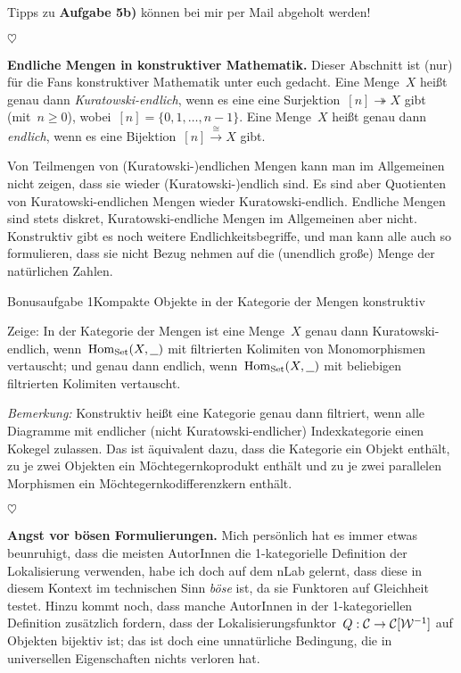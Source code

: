 \documentclass{uebblatt}
\newcommand{\stopper}{\begin{center}$\heartsuit$\end{center}}
\begin{document}
Tipps zu \textbf{Aufgabe 5b)} können bei mir per Mail abgeholt werden!

\stopper

\textbf{Endliche Mengen in konstruktiver Mathematik.} Dieser Abschnitt ist
(nur) für die Fans konstruktiver Mathematik unter euch gedacht.
Eine Menge~$X$ heißt genau dann \emph{Kuratowski-endlich}, wenn es eine
eine Surjektion~$[n] \twoheadrightarrow X$ gibt (mit~$n \geq 0$), wobei~$[n] =
\{0,1,\ldots,n-1\}$. Eine Menge~$X$ heißt genau dann \emph{endlich}, wenn es
eine Bijektion~$[n] \stackrel{\cong}{\to} X$ gibt.

Von Teilmengen von (Kuratowski-)endlichen Mengen kann man im Allgemeinen nicht
zeigen, dass sie wieder (Kuratowski-)endlich sind. Es sind aber Quotienten von
Kuratowski-endlichen Mengen wieder Kuratowski-endlich. Endliche Mengen sind
stets diskret, Kura\-towski-endliche Mengen im Allgemeinen aber nicht.
Konstruktiv gibt es noch weitere Endlichkeitsbegriffe, und man kann alle auch
so formulieren, dass sie nicht Bezug nehmen auf die (unendlich große) Menge der
natürlichen Zahlen.

\newpage

\begin{aufgabe*}{Bonusaufgabe 1}{Kompakte Objekte in der Kategorie der Mengen konstruktiv}

Zeige: In der Kategorie der Mengen ist eine Menge~$X$ genau dann
Kuratowski-endlich, wenn~$\mathrm{Hom}_{\mathrm{Set}}(X,\underline{\ \ })$ mit filtrierten
Kolimiten von Monomorphismen vertauscht; und genau dann endlich,
wenn~$\mathrm{Hom}_{\mathrm{Set}}(X,\underline{\ \ })$ mit beliebigen filtrierten Kolimiten
vertauscht.

\emph{Bemerkung:} Konstruktiv heißt eine Kategorie genau dann filtriert, wenn
alle Diagramme mit endlicher (nicht Kuratowski-endlicher) Indexkategorie einen
Kokegel zulassen. Das ist äquivalent dazu, dass die Kategorie ein Objekt
enthält, zu je zwei Objekten ein Möchtegernkoprodukt enthält und zu je zwei
parallelen Morphismen ein Möch\-te\-gern\-ko\-dif\-fe\-renz\-kern enthält.
\end{aufgabe*}
\vspace{-1em}

\stopper

\textbf{Angst vor bösen Formulierungen.}
Mich persönlich hat es immer etwas beunruhigt, dass die meisten AutorInnen die
1-kategorielle Definition der Lokalisierung verwenden, habe ich doch auf dem
nLab gelernt, dass diese in diesem Kontext im technischen Sinn \emph{böse} ist,
da sie Funktoren auf Gleichheit testet. Hinzu kommt noch, dass manche AutorInnen
in der 1-kategoriellen Definition zusätzlich fordern, dass der
Lokalisierungsfunktor~$Q : \mathcal{C} \to \mathcal{C}[\mathcal{W}^{-1}]$ auf Objekten bijektiv ist; das
ist doch eine unnatürliche Bedingung, die in universellen Eigenschaften nichts
verloren hat.
\end{document}
